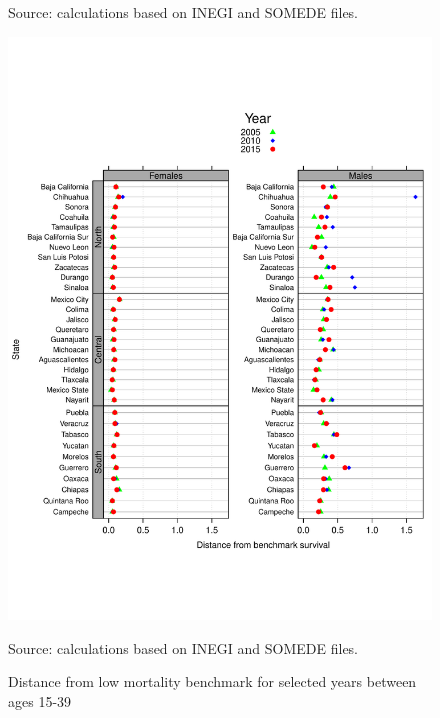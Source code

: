 \documentclass[11.5pt]{article}
\begin{document}
{\begin{figure}
Source: calculations based on INEGI and SOMEDE files.
\end{figure}


\begin{figure}
\centering
\caption{Distance from low mortality benchmark for selected years between ages 15-39}
\begin{center}
\includegraphics[scale=.5]{Distance_ya.pdf}
\end{center}

Source: calculations based on INEGI and SOMEDE files.
\end{figure}

}
\end{document}
